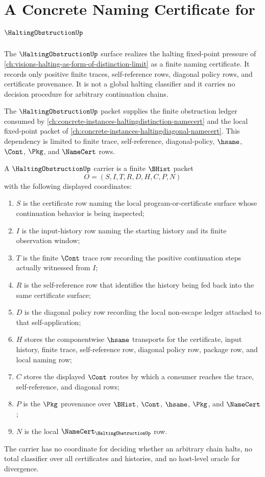 \chapter{A Concrete Naming Certificate for $\HaltingObstructionUp$}
\label{ch:concrete-instances-haltingobstruction-namecert}

The $\HaltingObstructionUp$ surface realizes the halting fixed-point pressure of \autoref{ch:visions-halting-as-form-of-distinction-limit} as a finite naming certificate. It records only positive finite traces, self-reference rows, diagonal policy rows, and certificate provenance. It is not a global halting classifier and it carries no decision procedure for arbitrary continuation chains.

The $\HaltingObstructionUp$ packet supplies the finite obstruction ledger consumed by \autoref{ch:concrete-instances-haltingdistinction-namecert} and the local fixed-point packet of \autoref{ch:concrete-instances-haltingdiagonal-namecert}. This dependency is limited to finite trace, self-reference, diagonal-policy, $\hsame$, $\Cont$, $\Pkg$, and $\NameCert$ rows.

\begin{definition}
\label{def:halting-obstruction-carrier}
A $\HaltingObstructionUp$ carrier is a finite $\BHist$ packet
$$
O=(S,I,T,R,D,H,C,P,N)
$$
with the following displayed coordinates:
\begin{enumerate}
\item $S$ is the certificate row naming the local program-or-certificate surface whose continuation behavior is being inspected;
\item $I$ is the input-history row naming the starting history and its finite observation window;
\item $T$ is the finite $\Cont$ trace row recording the positive continuation steps actually witnessed from $I$;
\item $R$ is the self-reference row that identifies the history being fed back into the same certificate surface;
\item $D$ is the diagonal policy row recording the local non-escape ledger attached to that self-application;
\item $H$ stores the componentwise $\hsame$ transports for the certificate, input history, finite trace, self-reference row, diagonal policy row, package row, and local naming row;
\item $C$ stores the displayed $\Cont$ routes by which a consumer reaches the trace, self-reference, and diagonal rows;
\item $P$ is the $\Pkg$ provenance over $\BHist$, $\Cont$, $\hsame$, $\Pkg$, and $\NameCert$;
\item $N$ is the local $\NameCert_{\HaltingObstructionUp}$ row.
\end{enumerate}
The carrier has no coordinate for deciding whether an arbitrary chain halts, no total classifier over all certificates and histories, and no host-level oracle for divergence.
\end{definition}

